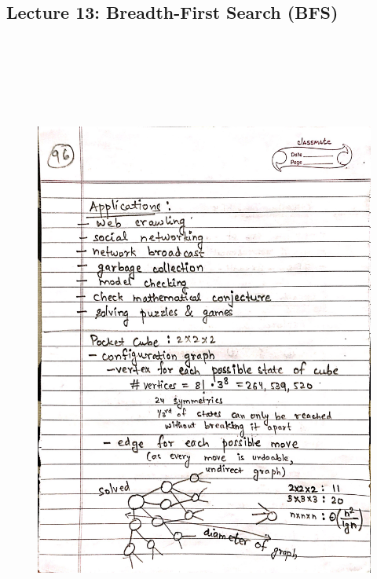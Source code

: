 \newpage
{\color{black} \subsection*{Lecture 13: Breadth-First Search (BFS)}}
\begin{figure}[H]
    \centering
    \includegraphics[width=16cm, height=21cm]{"./MIT-6.006/MIT-6006-096"}
\end{figure}

